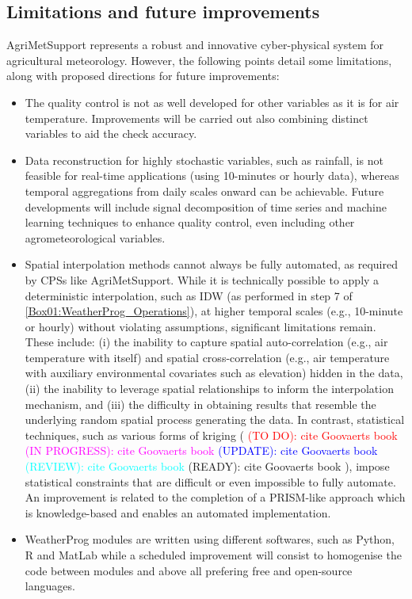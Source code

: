\documentclass[authoryear,preprint,review,12pt]{elsarticle}
\newcommand{\statusblock}[3]{
    \ifthenelse{\equal{#2}{todo}}
        {\textcolor{red}{#1 (TO DO): #3}}
        {}
    \ifthenelse{\equal{#2}{wip}}
        {\textcolor{magenta}{#1 (IN PROGRESS): #3}}
        {}
    \ifthenelse{\equal{#2}{update}}
        {\textcolor{blue}{#1 (UPDATE): #3}}
        {}
    \ifthenelse{\equal{#2}{review}}
        {\textcolor{cyan}{#1 (REVIEW): #3}}
        {}
    \ifthenelse{\equal{#2}{done}}
        {\textcolor{PineGreen}{#1 (READY): #3}}
        {}
}
\begin{document}
\subsection{Limitations and future improvements}
AgriMetSupport represents a robust and innovative cyber-physical system for agricultural meteorology.
However, the following points detail some limitations, along with proposed directions for future improvements:
\begin{itemize}
    
    \item The quality control is not as well developed for other variables as it is for air temperature. Improvements will be carried out also combining distinct variables to aid the check accuracy.
    
    \item Data reconstruction for highly stochastic variables, such as rainfall, is not feasible for real-time applications (using 10-minutes or hourly data), whereas temporal aggregations from daily scales onward can be achievable. Future developments will include signal decomposition of time series and machine learning techniques to enhance quality control, even including other agrometeorological variables.
    
    \item Spatial interpolation methods cannot always be fully automated, as required by CPSs like AgriMetSupport.  
    While it is technically possible to apply a deterministic interpolation, such as IDW (as performed in step 7 of \cref{Box01:WeatherProg_Operations}), at higher temporal scales (e.g., 10-minute or hourly) without violating assumptions, significant limitations remain.  
    These include: (i) the inability to capture spatial auto-correlation (e.g., air temperature with itself) and spatial cross-correlation (e.g., air temperature with auxiliary environmental covariates such as elevation) hidden in the data, (ii) the inability to leverage spatial relationships to inform the interpolation mechanism, and (iii) the difficulty in obtaining results that resemble the underlying random spatial process generating the data.  
    In contrast, statistical techniques, such as various forms of kriging (\statusblock{}{wip}{cite Goovaerts book}), impose statistical constraints that are difficult or even impossible to fully automate.
    An improvement is related to the completion of a PRISM-like approach which is knowledge-based and enables an automated implementation.

    \item WeatherProg modules are written using different softwares, such as Python, R and MatLab while a scheduled improvement will consist to homogenise the code between modules and above all prefering free and open-source languages.


\end{itemize}
\end{document}
